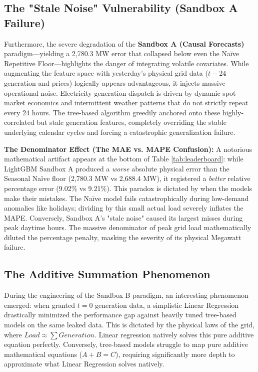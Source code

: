 \documentclass{article}
\begin{document}
\subsection*{The "Stale Noise" Vulnerability (Sandbox A Failure)}
Furthermore, the severe degradation of the \textbf{Sandbox A (Causal Forecasts)} paradigm—yielding a 2,780.3 MW error that collapsed below even the Naïve Repetitive Floor—highlights the danger of integrating volatile covariates. While augmenting the feature space with yesterday's physical grid data ($t-24$ generation and prices) logically appears advantageous, it injects massive operational noise. Electricity generation dispatch is driven by dynamic spot market economics and intermittent weather patterns that do not strictly repeat every 24 hours. The tree-based algorithm greedily anchored onto these highly-correlated but stale generation features, completely overriding the stable underlying calendar cycles and forcing a catastrophic generalization failure.

\vspace{0.2cm}
\noindent \textbf{The Denominator Effect (The MAE vs. MAPE Confusion):} 
A notorious mathematical artifact appears at the bottom of Table \ref{tab:leaderboard}: while LightGBM Sandbox A produced a \textit{worse} absolute physical error than the Seasonal Naïve floor (2,780.3 MW vs 2,688.4 MW), it registered a \textit{better} relative percentage error (9.02\% vs 9.21\%). This paradox is dictated by when the models make their mistakes. The Naïve model fails catastrophically during low-demand anomalies like holidays; dividing by this small actual load severely inflates the MAPE. Conversely, Sandbox A's "stale noise" caused its largest misses during peak daytime hours. The massive denominator of peak grid load mathematically diluted the percentage penalty, masking the severity of its physical Megawatt failure.

\subsection*{The Additive Summation Phenomenon}
During the engineering of the Sandbox B paradigm, an interesting phenomenon emerged: when granted $t=0$ generation data, a simplistic Linear Regression drastically minimized the performance gap against heavily tuned tree-based models on the same leaked data. This is dictated by the physical laws of the grid, where $Load \approx \sum Generation$. Linear regression natively solves this pure additive equation perfectly. Conversely, tree-based models struggle to map pure additive mathematical equations ($A + B = C$), requiring significantly more depth to approximate what Linear Regression solves natively.
\end{document}
